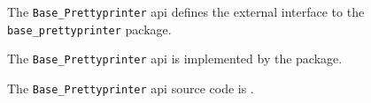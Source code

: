 
The {\tt Base\_Prettyprinter} api defines the external interface to the {\tt base\_prettyprinter} package.

The {\tt Base\_Prettyprinter} api is implemented by the  package.

The {\tt Base\_Prettyprinter} api source code is .



